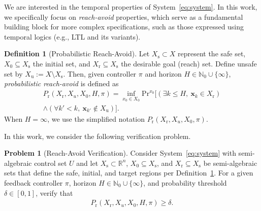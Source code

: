 \documentclass[journal,twoside,web]{ieeecolor}
\newcommand{\unsafe}{\mathrm{u}}
\newcommand{\safe}{\mathrm{s}}
\newcommand{\reach}{\mathrm{r}}
\newcommand{\pX}{\mathbf{x}}
\newcommand{\reals}{\mathbb{R}}
\newcommand{\hor}{H}
\newcommand{\Pfin}{P_{\reach}(X_{\reach}, X_u, X_0, \hor, \pi)}
\newcommand{\Pinf}{P_{\reach}(X_{\reach}, X_u, X_0, \pi)}
\theoremstyle{definition}
\newtheorem{definition}{Definition}
\newtheorem{problem}{Problem}
\theoremstyle{plain}
\theoremstyle{plain}
\begin{document}
% 

We are interested in the temporal properties of System~\eqref{eq:system}. In this work, we specifically focus on \textit{reach-avoid} properties, which serve as a fundamental building block for more complex specifications, such as those expressed using temporal logics (e.g., LTL and its variants).  

\begin{definition}[Probabilistic Reach-Avoid]
    \label{def: probabilistic reach-avoid}
    Let $X_\safe \subset X$ represent the safe set, $X_0 \subseteq X_\safe$ the initial set, and $X_\reach \subseteq X_\safe$ the desirable goal (reach) set. Define unsafe set by $X_\unsafe := X \setminus X_\safe$. 
    Then, given controller $\pi$ and horizon $\hor \in \mathbb{N}_0 \cup \{\infty\}$, \emph{probabilistic reach-avoid} is defined as
    \begin{multline*}
        \Pfin = \inf_{x_0 \in X_0} \mathrm{Pr}^{x_0}[ (\exists k \leq \hor, \ \pX_k \in X_\reach) \\
        \wedge 
        (\forall k' < k, \ \pX_{k'} \not\in X_\unsafe)]. 
    \end{multline*}
    When $\hor = \infty$, we use the simplified notation $\Pinf. $
\end{definition}

In this work, we consider the following verification problem.

\begin{problem}[Reach-Avoid Verification]
\label{Prob:ReachAvoidCertification}
Consider System~\eqref{eq:system} with semi-algebraic control set $U$ and 
let $X_\safe \subset \reals^n$,
$X_0 \subseteq X_\safe$,  and
$X_\reach \subseteq X_\safe$ be semi-algebraic sets that define the safe, initial, and target regions per Definition~\ref{def: probabilistic reach-avoid}.
For a given feedback controller $\pi$, horizon $\hor \in \mathbb{N}_0 \cup \{\infty\}$, and probability threshold $\delta \in [0,1]$,
verify that
    \begin{align*}
        \Pfin \geq \delta.
    \end{align*}
\end{problem}
\end{document}
